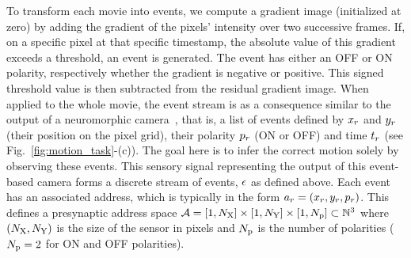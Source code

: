 \documentclass[default]{sn-jnl}%
\theoremstyle{thmstyleone}%
\theoremstyle{thmstyletwo}%
\theoremstyle{thmstylethree}%
\newcommand{\seeFig}[1]{see Fig.~\ref{fig:#1}}%
\newcommand{\note}[1]{{\sethlcolor{yellow}\hl{#1}}}
\begin{document}
To transform each movie into events, we compute a gradient image (initialized at zero) by adding the gradient of the pixels' intensity over two successive frames. If, on a specific pixel at that specific timestamp, the absolute value of this gradient exceeds a threshold, an event is generated. The event has either an OFF or ON polarity, respectively whether the gradient is negative or positive. This signed threshold value is then subtracted from the residual gradient image. When applied to the whole movie, the event stream is as a consequence similar to the output of a neuromorphic camera~\citep{rasetto_challenges_2022}, that is, a list of events defined by $x_r$ and $y_r$ (their position on the pixel grid), their polarity $p_r$ (ON or OFF) and time $t_r$  (\seeFig{motion_task}-(c)). The goal here is to infer the correct motion solely by observing these events. 
This sensory signal representing the output of this event-based camera forms a discrete stream of events, $\epsilon$ as defined above.   
Each event has an associated address, which is typically in the form $a_r=(x_r, y_r, p_r)$. This defines a presynaptic address space $\mathcal{A} = [1, N_\text{X}]\times[1, N_\text{Y}] \times [1, N_\text{p}] \subset \mathbb{N}^3$ where $(N_\text{X}, N_\text{Y})$ is the size of the sensor in pixels and $N_\text{p}$ is the number of polarities  ($N_\text{p}=2$ for ON and OFF polarities). 
%
\end{document}
